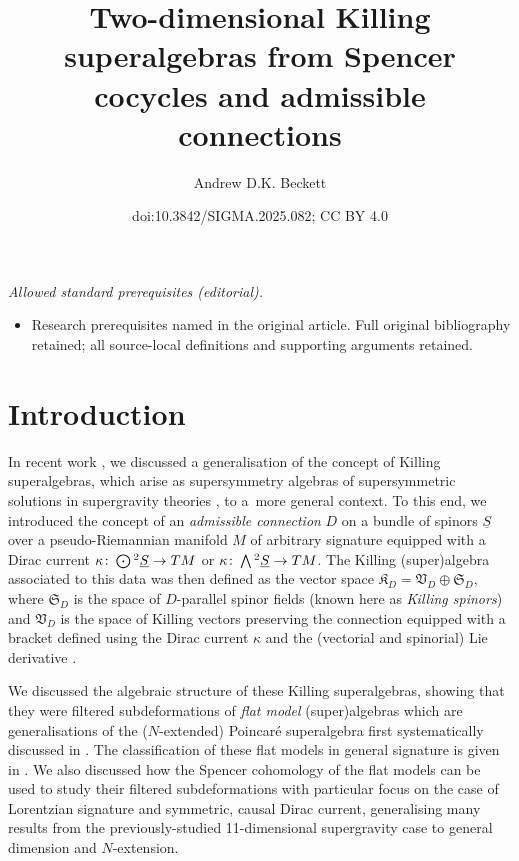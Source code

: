 \documentclass[10pt,a4paper]{amsart}
\title{Two-dimensional Killing superalgebras from Spencer cocycles and admissible connections}
\author{Andrew D.K. Beckett}
\date{doi:10.3842/SIGMA.2025.082; CC BY 4.0}
\numberwithin{equation}{section}
\newcommand{\fK}{\mathfrak{K}}
\newcommand{\fS}{\mathfrak{S}}
\newcommand{\fV}{\mathfrak{V}}
\newcommand{\Sbundle}{\underline{S}}
\newcommand{\Wedge}{\mathchoice{{\textstyle\bigwedge}}{\bigwedge}{\bigwedge}{\bigwedge}}	%
\newcommand{\Odot}{\mathchoice{{\textstyle\bigodot}}{\bigodot}{\bigodot}{\bigodot}}
\newcommand{\1}{\mathbbm{1}}
\begin{document}
\maketitle
\noindent\textit{Allowed standard prerequisites (editorial).}\begin{itemize}
\item Research prerequisites named in the original article. Full original bibliography retained; all source-local definitions and supporting arguments retained.
\end{itemize}\medskip
\section{Introduction}

In recent work \cite{Beckett2024_2}, we discussed a generalisation of the concept of Killing superalgebras, which arise as supersymmetry algebras of supersymmetric solutions in supergravity theories \cite{Figueroa-OFarrill2007_1}, to a~more general context. To this end, we introduced the concept of an \emph{admissible connection} $D$ on a bundle of spinors $\Sbundle$ over a pseudo-Riemannian manifold $M$ of arbitrary signature equipped with a Dirac current $\kappa\colon \Odot^2 \Sbundle\to TM$ or $\kappa\colon \Wedge^2 \Sbundle\to TM$. The Killing (super)algebra associated to this data was then defined as the vector space $\fK_D=\fV_D\oplus\fS_D$, where $\fS_D$ is the space of $D$-parallel spinor fields (known here as \emph{Killing spinors}) and $\fV_D$ is the space of Killing vectors preserving the connection equipped with a bracket defined using the Dirac current $\kappa$ and the (vectorial and spinorial) Lie derivative \cite[Definition~3.6]{Beckett2024_2}.

We discussed the algebraic structure of these Killing superalgebras, showing \cite[Theorem~3.10]{Beckett2024_2} that they were filtered subdeformations of \emph{flat model} (super)algebras which are generalisations of the ($N$-extended) Poincar\'e superalgebra first systematically discussed in \cite{Strathdee1986}. The classification of these flat models in general signature is given in \cite{Alekseevsky1997}. We also discussed how the Spencer cohomology of the flat models can be used to study their filtered subdeformations with particular focus on the case of Lorentzian signature and symmetric, causal Dirac current, generalising many results from the previously-studied 11-dimensional supergravity case \cite{Figueroa-OFarrill2017_1} to general dimension and $N$-extension.
\end{document}
